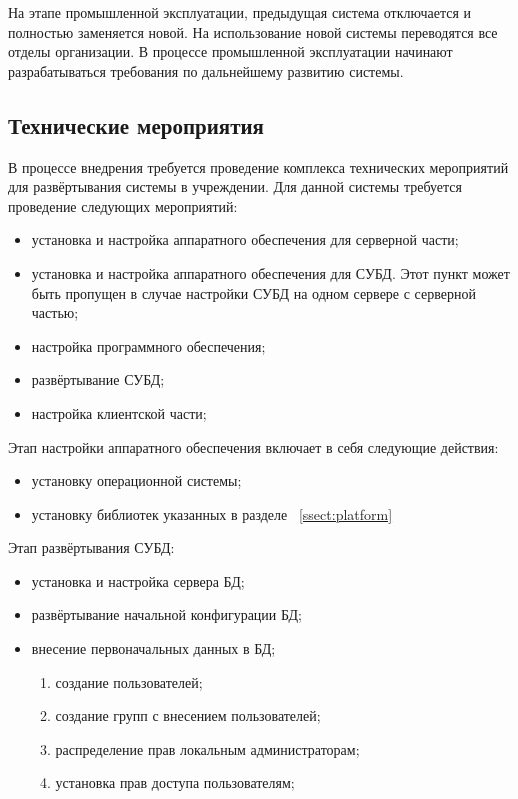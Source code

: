 \documentclass[utf8,usehyperref,12pt]{G7-32}
\begin{document}
На этапе промышленной эксплуатации, предыдущая система отключается и полностью заменяется новой. На использование новой системы переводятся все отделы организации. В процессе промышленной эксплуатации начинают разрабатываться требования по дальнейшему развитию системы.

\subsection{Технические мероприятия}

В процессе внедрения требуется проведение комплекса технических мероприятий для развёртывания системы в учреждении. Для данной системы требуется проведение следующих мероприятий:
\begin{itemize}
 \item установка и настройка аппаратного обеспечения для серверной части;
 \item установка и настройка аппаратного обеспечения для СУБД. Этот пункт может быть пропущен в случае настройки СУБД на одном сервере с серверной частью;
 \item настройка программного обеспечения;
 \item развёртывание СУБД;
 \item настройка клиентской части;
\end{itemize} 

Этап настройки аппаратного обеспечения включает в себя следующие действия:
\begin{itemize}
 \item установку операционной системы;
 \item установку библиотек указанных в разделе ~\ref{ssect:platform}
\end{itemize}

Этап развёртывания СУБД:
\begin{itemize}
 \item установка и настройка сервера БД;
 \item развёртывание начальной конфигурации БД;
 \item внесение первоначальных данных в БД;
 	\begin{enumerate}
 	 \item создание пользователей;
 	 \item создание групп с внесением пользователей;
 	 \item распределение прав локальным администраторам;
 	 \item установка прав доступа пользователям;
 	\end{enumerate}
\end{itemize}
\end{document}
